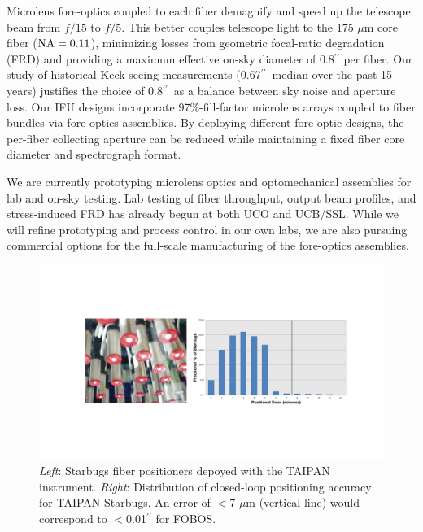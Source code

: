 \documentclass[oneside,11pt]{amsart}
\newcommand{\arcsec}{\mbox{$^{\prime\prime}$}}
\newcommand{\note}[2][todo]{{\color{#1}[[{\bf #2}]]}}
\begin{document}
Microlens fore-optics coupled to each fiber demagnify and speed up the telescope beam from $f/15$ to $f/5$. This better couples telescope light to the 175 $\mu$m core fiber (${\rm NA} = 0.11$), minimizing losses from geometric focal-ratio degradation (FRD) and providing a maximum effective on-sky diameter of $0.8\arcsec$ per fiber.  Our study of historical Keck seeing measurements (0.67\arcsec\ median over the past 15 years) justifies the choice of 0.8\arcsec\ as a balance between sky noise and aperture loss.
Our IFU designs incorporate 97\%-fill-factor microlens arrays coupled to fiber bundles via fore-optics assemblies.  By deploying different fore-optic designs, 
the per-fiber collecting aperture can be reduced while maintaining a fixed fiber core diameter and spectrograph format.  

We are currently prototyping microlens optics and optomechanical assemblies for lab and on-sky testing. Lab testing of fiber throughput, output beam profiles, and stress-induced FRD has already begun at both UCO and UCB/SSL.  While we will refine prototyping and process control in our own labs, we are also pursuing commercial options for the full-scale manufacturing of the fore-optics assemblies.




\begin{figure}[h!]
\vskip -0.1in
\includegraphics[width=\textwidth]{figs/starbugs_combined.pdf}
\caption{\small {\it Left}: Starbugs fiber positioners depoyed with the TAIPAN instrument. {\it Right}: Distribution of closed-loop positioning accuracy for TAIPAN Starbugs.  An error of $<$7 $\mu$m (vertical line) would correspond to $<$0.01\arcsec{} for FOBOS.}
\label{fig:starbugs}
\end{figure}
\end{document}
